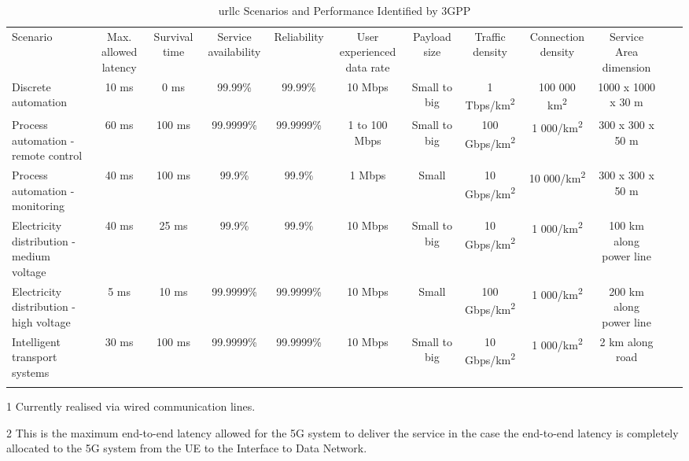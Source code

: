     \begin{sidewaystable*}
    \begin{threeparttable}
    \scriptsize
        \caption{\acrshort{urllc} Scenarios and Performance Identified by 3GPP}
        \label{tab:urllc-sc-per}
    \begin{tabularx}{\textwidth}{@{}l*{10}{C}c@{}}
    \addlinespace
    \toprule
        Scenario & Max. allowed latency & Survival time & Service availability & Reliability & User experienced data rate & Payload size & Traffic density & Connection density & Service Area dimension \\
    \addlinespace
    \midrule
    \addlinespace 
        Discrete automation & 10 ms & 0 ms & 99.99\% & 99.99\% & 10 Mbps & Small to big & 1 Tbps/km\textsuperscript{2} & 100 000 km\textsuperscript{2} & 1000 x 1000 x 30 m \\
        Process automation - remote control & 60 ms & 100 ms & 99.9999\% & 99.9999\% & 1 to 100 Mbps & Small to big & 100 Gbps/km\textsuperscript{2} & 1 000/km\textsuperscript{2} & 300 x 300 x 50 m \\
        Process automation - monitoring & 40 ms & 100 ms & 99.9\% & 99.9\% & 1 Mbps & Small & 10 Gbps/km\textsuperscript{2} & 10 000/km\textsuperscript{2} & 300 x 300 x 50 m \\
        Electricity distribution - medium voltage & 40 ms & 25 ms & 99.9\% & 99.9\% & 10 Mbps & Small to big & 10 Gbps/km\textsuperscript{2} & 1 000/km\textsuperscript{2} & 100 km along power line \\
        Electricity distribution - high voltage & 5 ms & 10 ms & 99.9999\% & 99.9999\% & 10 Mbps & Small & 100 Gbps/km\textsuperscript{2} & 1 000/km\textsuperscript{2} & 200 km along power line \\
        Intelligent transport systems & 30 ms & 100 ms & 99.9999\% & 99.9999\% & 10 Mbps & Small to big & 10 Gbps/km\textsuperscript{2} & 1 000/km\textsuperscript{2} & 2 km along road \\
    \addlinespace 
    \midrule
    \end{tabularx}
    \begin{tablenotes}
        \RaggedRight
        \item[1] Currently realised via wired communication lines. 
        \item[2] This is the maximum end-to-end latency allowed for the 5G system to deliver the service in the case the end-to-end latency is completely allocated to the 5G system from the UE to the Interface to Data Network.

\end{tablenotes}
\end{threeparttable}
\end{sidewaystable*}
